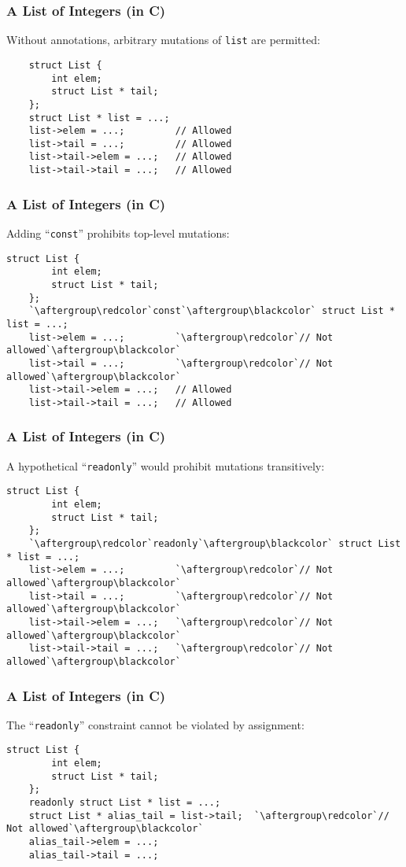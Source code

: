 \documentclass{beamer}
\newcommand{\code}[1]{\lstinline$#1$}
\begin{document}
\begin{frame}[containsverbatim]
\frametitle{A List of Integers (in C)}
Without annotations, arbitrary mutations of \code{list} are permitted:
\begin{lstlisting}
	struct List {
		int elem;
		struct List * tail;
	};
	struct List * list = ...;
	list->elem = ...;         // Allowed
	list->tail = ...;         // Allowed
	list->tail->elem = ...;   // Allowed
	list->tail->tail = ...;   // Allowed
\end{lstlisting}
\end{frame}

\begin{frame}[containsverbatim]
\frametitle{A List of Integers (in C)}
Adding ``\code{const}'' prohibits top-level mutations:
\begin{lstlisting}[escapechar=`]
	struct List {
		int elem;
		struct List * tail;
	};
	`\aftergroup\redcolor`const`\aftergroup\blackcolor` struct List * list = ...;
	list->elem = ...;         `\aftergroup\redcolor`// Not allowed`\aftergroup\blackcolor`
	list->tail = ...;         `\aftergroup\redcolor`// Not allowed`\aftergroup\blackcolor`
	list->tail->elem = ...;   // Allowed
	list->tail->tail = ...;   // Allowed
\end{lstlisting}
\end{frame}

\begin{frame}[containsverbatim]
\frametitle{A List of Integers (in C)}
A hypothetical ``\code{readonly}'' would prohibit mutations transitively:
\begin{lstlisting}[escapechar=`]
	struct List {
		int elem;
		struct List * tail;
	};
	`\aftergroup\redcolor`readonly`\aftergroup\blackcolor` struct List * list = ...;
	list->elem = ...;         `\aftergroup\redcolor`// Not allowed`\aftergroup\blackcolor`
	list->tail = ...;         `\aftergroup\redcolor`// Not allowed`\aftergroup\blackcolor`
	list->tail->elem = ...;   `\aftergroup\redcolor`// Not allowed`\aftergroup\blackcolor`
	list->tail->tail = ...;   `\aftergroup\redcolor`// Not allowed`\aftergroup\blackcolor`
\end{lstlisting}
\end{frame}

\begin{frame}[containsverbatim]
\frametitle{A List of Integers (in C)}
The ``\code{readonly}'' constraint cannot be violated by assignment:
\begin{lstlisting}[escapechar=`]
	struct List {
		int elem;
		struct List * tail;
	};
	readonly struct List * list = ...;
	struct List * alias_tail = list->tail;  `\aftergroup\redcolor`// Not allowed`\aftergroup\blackcolor`
	alias_tail->elem = ...;
	alias_tail->tail = ...;
\end{lstlisting}
\end{frame}
\end{document}
